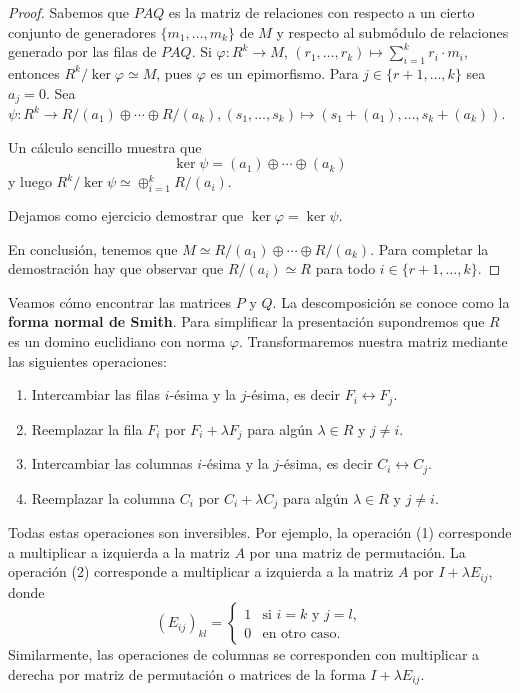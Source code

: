 \begin{proof}
	Sabemos que $PAQ$ es la matriz de relaciones con respecto a un cierto conjunto de generadores $\{m_1,\dots,m_k\}$ de $M$
	y respecto al submódulo de relaciones generado por las filas de $PAQ$. 
	Si $\varphi\colon R^k\to M$, $(r_1,\dots,r_k)\mapsto \sum_{i=1}^k r_i\cdot m_i$, 
	entonces $R^k/\ker\varphi\simeq M$, pues $\varphi$ es un epimorfismo. Para $j\in\{r+1,\dots,k\}$ sea $a_j=0$.
	Sea $\psi\colon R^k\to R/(a_1)\oplus\cdots\oplus R/(a_k), (s_1,\dots,s_k)\mapsto (s_1+(a_1),\dots,s_k+(a_k))$. 
	 
	Un cálculo sencillo muestra que 
	\[
	\ker\psi=(a_1)\oplus\cdots\oplus (a_k)
	\]
	y luego 
	$R^k/\ker\psi\simeq \oplus_{i=1}^k R/(a_i)$. 
	
	Dejamos como ejercicio demostrar que $\ker\varphi=\ker\psi$. 
	

    En conclusión, 
 	tenemos que $M\simeq R/(a_1)\oplus\cdots\oplus R/(a_k)$. Para completar la demostración hay que 
 	observar que $R/(a_i)\simeq R$ para todo $i\in\{r+1,\dots,k\}$. 
\end{proof}

Veamos cómo encontrar las matrices $P$ y $Q$. La descomposición se conoce
como la \textbf{forma normal de Smith}. 
Para simplificar la presentación supondremos que $R$ es un domino euclidiano con norma $\varphi$. 
Transformaremos nuestra matriz mediante las siguientes operaciones:
\begin{enumerate}
	\item Intercambiar las filas $i$-ésima y la $j$-ésima, es decir $F_i\leftrightarrow F_j$.
	\item Reemplazar la fila $F_i$ por $F_i+\lambda F_j$ para algún $\lambda\in R$ y $j\ne i$.
	\item Intercambiar las columnas $i$-ésima y la $j$-ésima, es decir $C_i\leftrightarrow C_j$.
	\item Reemplazar la columna $C_i$ por $C_i+\lambda C_j$ para algún $\lambda\in R$ y $j\ne i$. 
\end{enumerate}
Todas estas operaciones son inversibles. Por ejemplo, la operación (1) corresponde a multiplicar
a izquierda a la matriz $A$ por una matriz de permutación. La operación (2) corresponde 
a multiplicar a izquierda a la matriz $A$ por $I+\lambda E_{ij}$, donde 
\[
(E_{ij})_{kl}=\begin{cases}
1 & \text{si $i=k$ y $j=l$},\\
0 & \text{en otro caso}.	
\end{cases}
\]
Similarmente, las operaciones de columnas se corresponden con multiplicar a derecha por matriz de 
permutación o matrices de la forma $I+\lambda E_{ij}$. 
  

